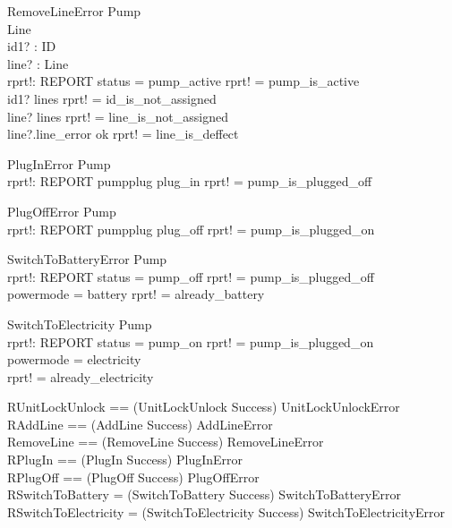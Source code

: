\documentclass{article}
\begin{document}
\begin{schema}{RemoveLineError}
	\Xi Pump \\
	\Xi Line \\
	id1? : ID \\
	line? : Line \\
	rprt!: REPORT
	\where
	status = pump\_active \implies rprt! = pump\_is\_active \\
	id1? \nin \dom lines \implies rprt! = id\_is\_not\_assigned \\
	line? \in \ran lines \implies rprt! = line\_is\_not\_assigned \\
	line?.line\_error \neq ok \implies rprt! = line\_is\_deffect \\
\end{schema}

\begin{schema}{PlugInError}
	\Xi Pump \\
	rprt!: REPORT
	\where
	pumpplug \neq plug\_in \implies rprt! = pump\_is\_plugged\_off \\
\end{schema}

\begin{schema}{PlugOffError}
	\Xi Pump \\
	rprt!: REPORT
	\where
	pumpplug \neq plug\_off \implies rprt! = pump\_is\_plugged\_on \\
\end{schema}

\begin{schema}{SwitchToBatteryError}
	\Xi Pump \\
	rprt!: REPORT
	\where
	status = pump\_off \implies rprt! = pump\_is\_plugged\_off \\
	powermode = battery \implies rprt! = already\_battery \\
\end{schema}

\begin{schema}{SwitchToElectricity}
	\Xi Pump \\
	rprt!: REPORT
	\where
	status = pump\_on \implies rprt! = pump\_is\_plugged\_on \\
	powermode = electricity\\ \implies rprt! = already\_electricity \\
\end{schema}

\begin{zed}
	RUnitLockUnlock == (UnitLockUnlock \land Success) \lor UnitLockUnlockError \\
	RAddLine == (AddLine \land Success) \lor AddLineError \\
	RemoveLine == (RemoveLine \land Success) \lor RemoveLineError \\
	RPlugIn == (PlugIn \land Success) \lor PlugInError \\
	RPlugOff == (PlugOff \land Success) \lor PlugOffError \\
	RSwitchToBattery = (SwitchToBattery \land Success) \lor SwitchToBatteryError \\
	RSwitchToElectricity = (SwitchToElectricity \land Success) \lor SwitchToElectricityError \\
\end{zed}
\end{document}
